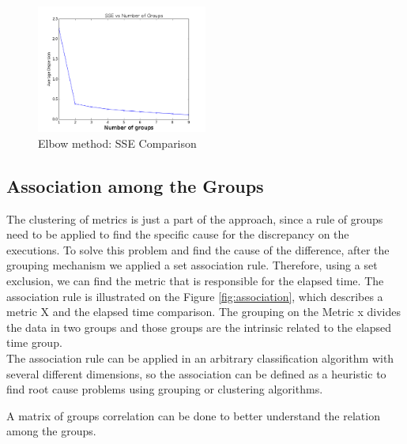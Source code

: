     \begin{figure}[h]
      \centering
        \includegraphics[width=0.50\textwidth]{figures/SSE.png}
        \caption{Elbow method: SSE Comparison}
        \label{fig:sse}
    \end{figure}


\subsection{\textbf{Association among the Groups}}
\label{sec:association}
The clustering of metrics is just a part of the approach, since a rule of groups need to be applied to find the specific cause for the discrepancy on the executions. To solve this problem and find the cause of the difference, after the grouping mechanism we applied a set association rule. Therefore, using a set exclusion, we can find the metric that is responsible for the elapsed time.
The association rule is illustrated on the Figure \ref{fig:association}, which describes a metric X and the elapsed time comparison. The grouping on the Metric x divides the data in two groups and those groups are the intrinsic related to the elapsed time group. \\
The association rule can be applied in an arbitrary classification algorithm with several different dimensions, so the association can be defined as a heuristic to find root cause problems using grouping or clustering algorithms.

A matrix of groups correlation can be done to better understand the relation among the groups.


    
